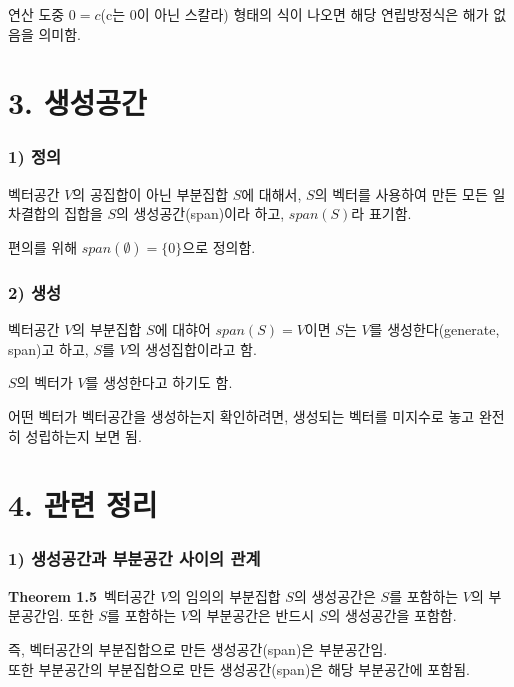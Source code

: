 연산 도중 $0=c$(c는 0이 아닌 스칼라) 형태의 식이 나오면 해당 연립방정식은 해가 없음을 의미함.\\


\newpage


\section*{3. 생성공간}

\subsubsection*{1) 정의\\}
\begin{DEF}
벡터공간 $V$의 공집합이 아닌 부분집합 $S$에 대해서, $S$의 벡터를 사용하여 만든 모든 일차결합의 집합을 $S$의 생성공간(span)이라 하고, $span(S)$라 표기함.
\end{DEF}

편의를 위해 $span(\emptyset)= \{ 0 \}$으로 정의함.

\subsubsection*{2) 생성}
벡터공간 $V$의 부분집합 $S$에 대햐어 $span(S)=V$이면 $S$는 $V$를 생성한다(generate, span)고 하고, $S$를 $V$의 생성집합이라고 함.

$S$의 벡터가 $V$를 생성한다고 하기도 함.

어떤 벡터가 벡터공간을 생성하는지 확인하려면, 생성되는 벡터를 미지수로 놓고 완전히 성립하는지 보면 됨.\\

\section*{4. 관련 정리}
\subsubsection*{1) 생성공간과 부분공간 사이의 관계}
\textbf{Theorem 1.5}\, 벡터공간 $V$의 임의의 부분집합 $S$의 생성공간은 $S$를 포함하는 $V$의 부분공간임. 또한 $S$를 포함하는 $V$의 부분공간은 반드시 $S$의 생성공간을 포함함.

즉, 벡터공간의 부분집합으로 만든 생성공간(span)은 부분공간임.\\
또한 부분공간의 부분집합으로 만든 생성공간(span)은 해당 부분공간에 포함됨.\\


\newpage


